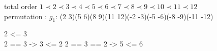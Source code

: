 
total order $ 1 \prec 2 \prec 3 \prec 4 \prec 5 \prec 6 \prec 7 \prec 8 \prec 9 \prec 10 \prec 11 \prec 12$\\
permutation : $g_1$: (2 3)(5 6)(8 9)(11 12)(-2 -3)(-5 -6)(-8 -9)(-11 -12)  

2 <= 3 \\
2 == 3 -> 3 <= 2
2 == 3  == 2 -> 5 <= 6